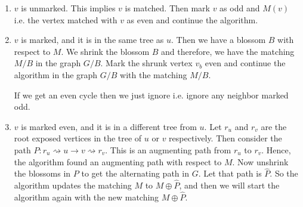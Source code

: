 \begin{enumerate}[label=Case \arabic*:, leftmargin=*, align=left]
	\item $v$ is unmarked. This implies $v$ is matched. Then mark $v$ as odd and $M(v)$ i.e. the vertex matched with $v$ as even and continue the algorithm.
	\item $v$ is marked, and it is in the same tree as $u$. Then we have a blossom $B$ with respect to $M$. We shrink the blossom $B$ and therefore, we have the matching $M/B$ in the graph $G/B$. Mark the shrunk vertex $v_b$ even and continue the algorithm in the graph $G/B$ with the matching $M/B$.

	      If we get an even cycle then we just ignore i.e. ignore any neighbor marked odd.
	\item $v$ is marked even, and it is in a different tree from $u$. Let $r_u$ and $r_v$ are the root exposed vertices in the tree of $u$ or $v$ respectively. Then consider the path $P:r_u\rightsquigarrow u\to v\rightsquigarrow r_v$. This is an augmenting path from $r_u$ to $r_v$. Hence, the algorithm found an augmenting path with respect to $M$. Now unshrink the blossoms in $P$ to get the alternating path in $G$. Let that path is $\hat{P}$. So the algorithm updates the matching $M$ to $M\oplus \hat{P}$, and then we will start the algorithm again with the new matching $M\oplus \hat{P}$.

	      \begin{center}
		      \usetikzlibrary{arrows.meta, calc, decorations.pathreplacing}
\end{center}
\end{enumerate}
